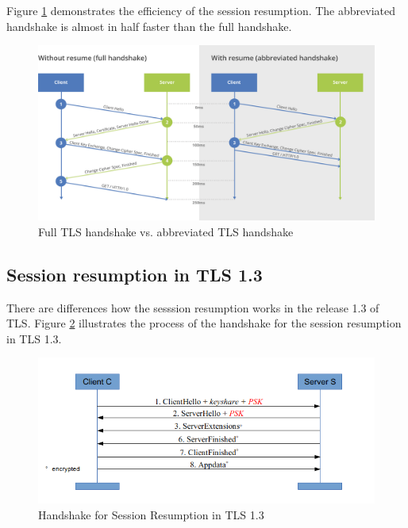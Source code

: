 Figure \ref{fig:without-with-resume-1_2} demonstrates the efficiency of the session resumption. The abbreviated handshake is almost in half faster than the full handshake.

\begin{figure}[H]
	\centering
		\includegraphics[scale=0.4]{images/without-with-resume-1_2.png}
	\caption{Full TLS handshake vs. abbreviated TLS handshake \cite{cloudflare:resume}}
	\label{fig:without-with-resume-1_2}
\end{figure}

\subsection{Session resumption in TLS 1.3}
\label{subsec:resumption1_3}

There are differences how the sesssion resumption works in the release 1.3 of TLS. Figure \ref{fig:resumption1_3} illustrates the process of the handshake for the session resumption in TLS 1.3.

\begin{figure}[H]
	\centering
		\includegraphics[scale=0.8]{images/resumption1_3.png}
	\caption{Handshake for Session Resumption in TLS 1.3 \cite{Hassenstein}}
	\label{fig:resumption1_3}
\end{figure}

